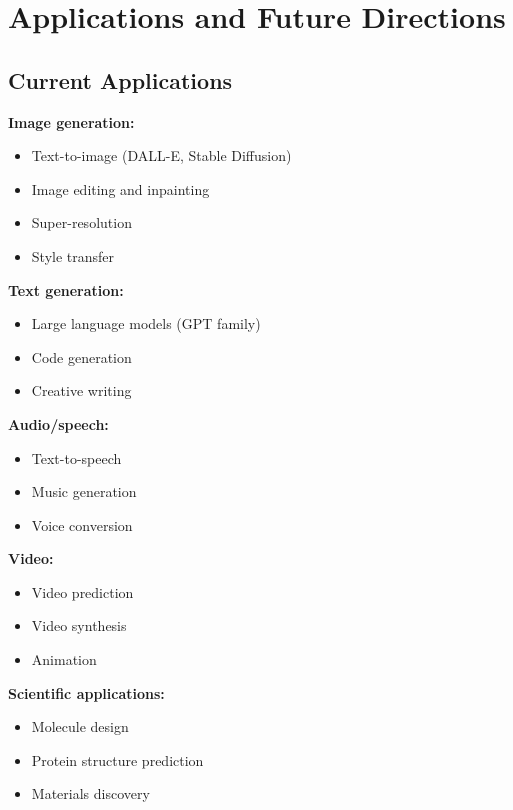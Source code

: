 
\section{Applications and Future Directions }
\label{sec:generative-applications}

\subsection{Current Applications}

\textbf{Image generation:}
\begin{itemize}
    \item Text-to-image (DALL-E, Stable Diffusion)
    \item Image editing and inpainting
    \item Super-resolution
    \item Style transfer
\end{itemize}

\textbf{Text generation:}
\begin{itemize}
    \item Large language models (GPT family)
    \item Code generation
    \item Creative writing
\end{itemize}

\textbf{Audio/speech:}
\begin{itemize}
    \item Text-to-speech
    \item Music generation
    \item Voice conversion
\end{itemize}

\textbf{Video:}
\begin{itemize}
    \item Video prediction
    \item Video synthesis
    \item Animation
\end{itemize}

\textbf{Scientific applications:}
\begin{itemize}
    \item Molecule design
    \item Protein structure prediction
    \item Materials discovery
\end{itemize}

